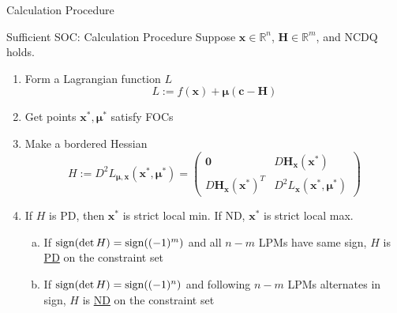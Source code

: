 \documentclass[a4paper,11pt]{article}
\newcommand{\bb}{\mathbb}
\newcommand{\bd}{\mathbf}
\begin{document}
\begin{frame}[t]{Calculation Procedure}
	\begin{block}
		{Sufficient SOC: Calculation Procedure}
		Suppose $\bd{x}\in{\bb{R}^n}$, $\bd{H}\in\bb{R}^m$, and NCDQ holds.
		\begin{enumerate}
			\item Form a Lagrangian function $L$\[
				L:= f(\bd{x}) + \bd{\mu}(\bd{c}-\bd{H})
			\]
			\item Get points $\bd{x^\ast,\mu^\ast}$ satisfy FOCs
			\item Make a bordered Hessian\[
				H:=D^2L_{\bd{\mu,x}}(\bd{x^\ast,\mu^\ast})
				=\begin{pmatrix}
					\bd{0}&D\bd{H}_{\bd{x}}(\bd{x^\ast})\\
					D\bd{H}_{\bd{x}}(\bd{x^\ast})^T& D^2L_{\bd{x}}(\bd{x^\ast,\mu^\ast})
				\end{pmatrix}
			\]
			\item If $H$ is PD, then $\bd{x^\ast}$ is strict local min. If ND, $\bd{x^\ast}$ is strict local max.
			\begin{enumerate}[(a)]
				\item If ${\rm sign}(\det H)={\rm sign}((-1)^m)$ and all $n-m$ LPMs have same sign, $H$ is \uline{PD} on the constraint set
				\item If ${\rm sign}(\det H)={\rm sign}((-1)^n)$ and following $n-m$ LPMs alternates in sign, $H$ is \uline{ND} on the constraint set 
			\end{enumerate}
		\end{enumerate}
	\end{block}
\end{frame}
\end{document}
